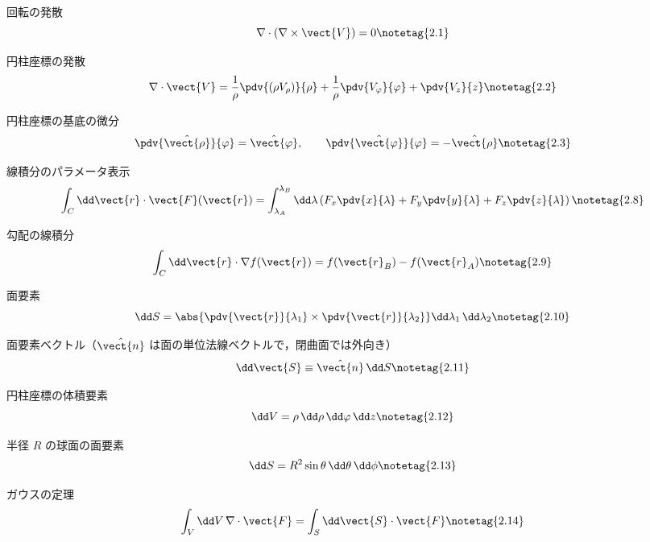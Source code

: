 \documentclass[uplatex,dvipdfmx,a4paper,11pt]{jsarticle}
\begin{document}
\begin{kirokuichiran}
\end{kirokuichiran}

\youtenseiri
\begin{noteshikilist}
  \item 回転の発散 %
    \[ \nabla\cdot(\nabla\times\vect{V}) = 0 \notetag{2.1} \]
  \item 円柱座標の発散 %
    \[ \nabla\cdot\vect{V} = \frac{1}{\rho}\pdv{(\rho V_\rho)}{\rho} + \frac{1}{\rho}\pdv{V_\varphi}{\varphi} + \pdv{V_z}{z} \notetag{2.2} \]
  \item 円柱座標の基底の微分 %
    \[ \pdv{\hat{\vect{\rho}}}{\varphi} = \hat{\vect{\varphi}}, \qquad \pdv{\hat{\vect{\varphi}}}{\varphi} = -\hat{\vect{\rho}} \notetag{2.3} \]
  \item 線積分のパラメータ表示 %
    \[ \int_C \dd\vect{r}\cdot\vect{F}(\vect{r}) = \int_{\lambda_A}^{\lambda_B}\dd\lambda\left(F_x\pdv{x}{\lambda} + F_y\pdv{y}{\lambda} + F_z\pdv{z}{\lambda}\right) \notetag{2.8} \]
  \item 勾配の線積分 %
    \[ \int_C \dd\vect{r}\cdot\nabla f(\vect{r}) = f(\vect{r}_B) - f(\vect{r}_A) \notetag{2.9} \]
  \item 面要素 %
    \[ \dd S = \abs{\pdv{\vect{r}}{\lambda_1}\times\pdv{\vect{r}}{\lambda_2}}\dd\lambda_1\,\dd\lambda_2 \notetag{2.10} \]
  \item 面要素ベクトル（$\hat{\vect{n}}$ は面の単位法線ベクトルで，閉曲面では外向き） %
    \[ \dd\vect{S} \equiv \hat{\vect{n}}\,\dd S \notetag{2.11} \]
  \item 円柱座標の体積要素 %
    \[ \dd V = \rho\,\dd\rho\,\dd\varphi\,\dd z \notetag{2.12} \]
  \item 半径 $R$ の球面の面要素 %
    \[ \dd S = R^2\sin\theta\,\dd\theta\,\dd\phi \notetag{2.13} \]
  \item ガウスの定理 %
    \[ \int_V \dd V\,\nabla\cdot\vect{F} = \int_S \dd\vect{S}\cdot\vect{F} \notetag{2.14} \]

\end{noteshikilist}
\end{document}
